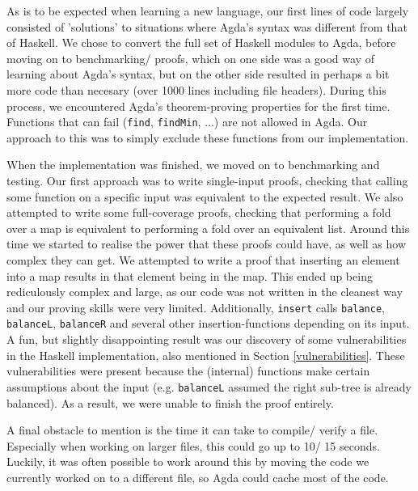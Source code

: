 \documentclass[a4paper,UKenglish,cleveref, autoref, thm-restate]{template/lipics-v2021}
\begin{document}
As is to be expected when learning a new language, our first lines of code largely consisted of 'solutions' to situations where Agda's syntax was different from that of Haskell. We chose to convert the full set of Haskell modules to Agda, before moving on to benchmarking/ proofs, which on one side was a good way of learning about Agda's syntax, but on the other side resulted in perhaps a bit more code than necesary (over 1000 lines including file headers). During this process, we encountered Agda's theorem-proving properties for the first time. Functions that can fail (\texttt{find}, \texttt{findMin}, ...) are not allowed in Agda. Our approach to this was to simply exclude these functions from our implementation.

When the implementation was finished, we moved on to benchmarking and testing. Our first approach was to write single-input proofs, checking that calling some function on a specific input was equivalent to the expected result. We also attempted to write some full-coverage proofs, checking that performing a fold over a map is equivalent to performing a fold over an equivalent list. Around this time we started to realise the power that these proofs could have, as well as how complex they can get. We attempted to write a proof that inserting an element into a map results in that element being in the map. This ended up being rediculously complex and large, as our code was not written in the cleanest way and our proving skills were very limited. Additionally, \texttt{insert} calls \texttt{balance}, \texttt{balanceL}, \texttt{balanceR} and several other insertion-functions depending on its input. A fun, but slightly disappointing result was our discovery of some vulnerabilities in the Haskell implementation, also mentioned in Section \ref{vulnerabilities}. These vulnerabilities were present because the (internal) functions make certain assumptions about the input (e.g. \texttt{balanceL} assumed the right sub-tree is already balanced). As a result, we were unable to finish the proof entirely.

A final obstacle to mention is the time it can take to compile/ verify a file. Especially when working on larger files, this could go up to 10/ 15 seconds. Luckily, it was often possible to work around this by moving the code we currently worked on to a different file, so Agda could cache most of the code.
\end{document}
